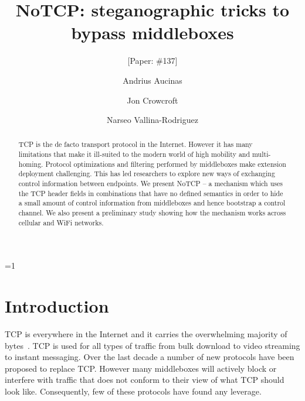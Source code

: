\documentclass{sig-alternate-10pt}
\def\anon{1}        %
\begin{document}
\date{}


\title{NoTCP: steganographic tricks to bypass middleboxes}
\ifnum\anon=1
\author{[Paper: \#137]}%
\else
{}
\author{
\alignauthor Andrius Aucinas\\
\and
\alignauthor Jon Crowcroft\\
\and
\alignauthor Narseo Vallina-Rodriguez\\
}
\fi

    
\maketitle
\begin{abstract}
TCP is the de facto transport protocol in the Internet. However it has many limitations that make it ill-suited to the modern world of high mobility and multi-homing. Protocol optimizations and filtering performed by middleboxes make extension deployment challenging. This has led researchers to explore new ways of exchanging control information between endpoints. We present NoTCP -- a mechanism which uses the TCP header fields in combinations that have no defined semantics in order to hide a small amount of control information from middleboxes and hence bootstrap a control channel. We also present a preliminary study showing how the mechanism works across cellular and WiFi networks.
\end{abstract} 

\section{Introduction}
\label{section:intro}

TCP is everywhere in the Internet and it carries the overwhelming majority of bytes~\cite{John:2007dv}. TCP is used for all types of traffic from bulk download to video streaming to instant messaging. Over the last decade a number of new protocols have been proposed to replace TCP. However many middleboxes will actively block or interfere with traffic that does not conform to their view of what TCP should look like. Consequently, few of these protocols have found any leverage.
\end{document}
